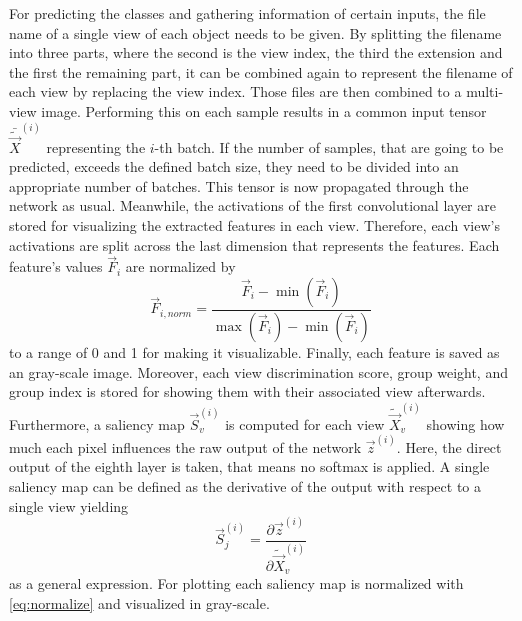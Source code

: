 For predicting the classes and gathering information of certain inputs, the file name of a single view of each object needs to be given.
By splitting the filename into three parts, where the second is the view index, the third the extension and the first the remaining part, it can be combined again to represent the filename of each view by replacing the view index.
Those files are then combined to a multi-view image.
Performing this on each sample results in a common input tensor $\bar{\tilde{\vec{X}}}^{(i)}$ representing the $i$-th batch.
If the number of samples, that are going to be predicted, exceeds the defined batch size, they need to be divided into an appropriate number of batches.
This tensor is now propagated through the network as usual.
Meanwhile, the activations of the first convolutional layer are stored for visualizing the extracted features in each view.
Therefore, each view's activations are split across the last dimension that represents the features.
Each feature's values $\vec{F}_i$ are normalized by
\begin{equation}
	\label{eq:normalize}
	\vec{F}_{i,norm} = \frac{\vec{F}_i - \min(\vec{F}_i)}{\max(\vec{F}_i) - \min(\vec{F}_i)} 
\end{equation}
to a range of 0 and 1 for making it visualizable.
Finally, each feature is saved as an gray-scale image.
Moreover, each view discrimination score, group weight, and group index is stored for showing them with their associated view afterwards.
Furthermore, a saliency map $\vec{S}_v^{(i)}$ is computed for each view $\tilde{\vec{X}}_v^{(i)}$ showing how much each pixel influences the raw output of the network $\vec{z}^{(i)}$.
Here, the direct output of the eighth layer is taken, that means no softmax is applied.
A single saliency map can be defined as the derivative of the output with respect to a single view yielding
\begin{equation}
	\label{eq:saliency-map}
	\vec{S}_j^{(i)} = \frac{\partial \vec{z}^{(i)}}{\partial \tilde{\vec{X}}_v^{(i)}}
\end{equation}
as a general expression.
For plotting each saliency map is normalized with \eqref{eq:normalize} and visualized in gray-scale.